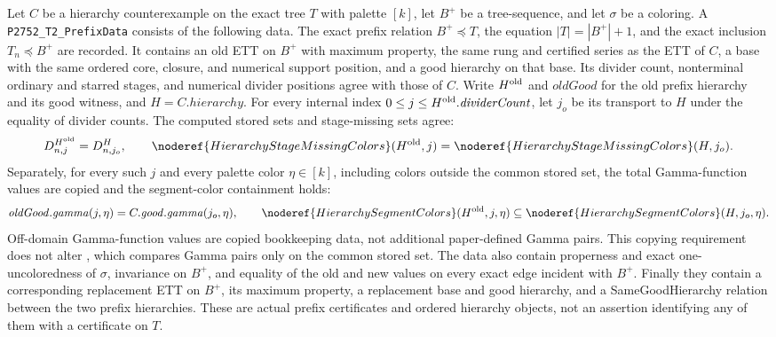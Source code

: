 \begin{definition}
Let $C$ be a hierarchy counterexample on the exact tree $T$ with palette
$[k]$, let $B^+$ be a tree-sequence, and let $\sigma$ be a coloring. A
\texttt{P2752\_T2\_PrefixData} consists of the following data.
The exact prefix relation $B^+\preccurlyeq T$, the equation
$|T|=|B^+|+1$, and the exact inclusion $T_n\preccurlyeq B^+$ are recorded.
It contains an old ETT on $B^+$ with maximum property, the same rung and
certified series as the ETT of $C$, a base with the same ordered core,
closure, and numerical support position, and a good hierarchy on that
base. Its divider count, nonterminal ordinary and starred stages, and
numerical divider positions agree with those of $C$. Write $H^{\rm old}$
and $\mathit{oldGood}$ for the old prefix hierarchy and its good witness,
and $H=C.\mathit{hierarchy}$. For every internal index
$0\leq j\leq H^{\rm old}.\mathit{dividerCount}$, let $j_o$ be its
transport to $H$ under the equality of divider counts. The computed
stored sets and stage-missing sets agree:
\[
 D^{H^{\rm old}}_{n,j}=D^H_{n,j_o},\qquad
 \noderef{HierarchyStageMissingColors}(H^{\rm old},j)
   =\noderef{HierarchyStageMissingColors}(H,j_o).
\]
Separately, for every such $j$ and every palette color $\eta\in[k]$,
including colors outside the common stored set, the total Gamma-function
values are copied and the segment-color containment holds:
\[
 \mathit{oldGood}.\mathit{gamma}(j,\eta)
   =C.\mathit{good}.\mathit{gamma}(j_o,\eta),\qquad
 \noderef{HierarchySegmentColors}(H^{\rm old},j,\eta)
   \subseteq\noderef{HierarchySegmentColors}(H,j_o,\eta).
\]
Off-domain Gamma-function values are copied bookkeeping data, not
additional paper-defined Gamma pairs. This copying requirement does not
alter , which compares Gamma pairs only on
the common stored set.
The data also contain properness and exact one-uncoloredness of $\sigma$,
invariance on $B^+$, and equality of the old and new values on every exact
edge incident with $B^+$. Finally they contain a corresponding replacement
ETT on $B^+$, its maximum property, a replacement base and good hierarchy,
and a SameGoodHierarchy relation between the two prefix hierarchies.
These are actual prefix certificates and ordered hierarchy objects, not
an assertion identifying any of them with a certificate on $T$.
\end{definition}
